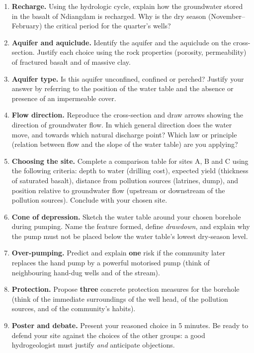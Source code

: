 \documentclass[11pt]{article}
\begin{document}
\begin{enumerate}
\item \textbf{Recharge.} Using the hydrologic cycle, explain how the groundwater stored in the basalt of Ndiangdam is recharged. Why is the dry season (November--February) the critical period for the quarter's wells?
\item \textbf{Aquifer and aquiclude.} Identify the aquifer and the aquiclude on the cross-section. Justify each choice using the rock properties (porosity, permeability) of fractured basalt and of massive clay.
\item \textbf{Aquifer type.} Is this aquifer unconfined, confined or perched? Justify your answer by referring to the position of the water table and the absence or presence of an impermeable cover.
\item \textbf{Flow direction.} Reproduce the cross-section and draw arrows showing the direction of groundwater flow. In which general direction does the water move, and towards which natural discharge point? Which law or principle (relation between flow and the slope of the water table) are you applying?
\item \textbf{Choosing the site.} Complete a comparison table for sites A, B and C using the following criteria: depth to water (drilling cost), expected yield (thickness of saturated basalt), distance from pollution sources (latrines, dump), and position relative to groundwater flow (upstream or downstream of the pollution sources). Conclude with your chosen site.
\item \textbf{Cone of depression.} Sketch the water table around your chosen borehole during pumping. Name the feature formed, define \emph{drawdown}, and explain why the pump must not be placed below the water table's lowest dry-season level.
\item \textbf{Over-pumping.} Predict and explain \textbf{one} risk if the community later replaces the hand pump by a powerful motorised pump (think of neighbouring hand-dug wells and of the stream).
\item \textbf{Protection.} Propose \textbf{three} concrete protection measures for the borehole (think of the immediate surroundings of the well head, of the pollution sources, and of the community's habits).
\item \textbf{Poster and debate.} Present your reasoned choice in 5 minutes. Be ready to defend your site against the choices of the other groups: a good hydrogeologist must justify \emph{and} anticipate objections.
\end{enumerate}
\end{document}
